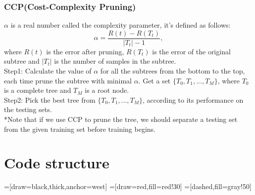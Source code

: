 \documentclass[50pt]{article}
\begin{document}
\subsubsection{CCP(Cost-Complexity Pruning)}
$\alpha$ is a real number called the complexity parameter, it's defined as follows: 
$$\alpha = \frac{R(t)- R(T_{t})}{|T_{t}|-1},$$ where $R(t)$ is the error after pruning, $R(T_{t})$ is the error of the original subtree and $|T_{t}|$ is the number of samples in the subtree.\\
Step1: Calculate the value of $\alpha$ for all the subtrees from the bottom to the top, each time prune the subtree with minimal $\alpha$. Get a set $\{T_{0}, T_{1},..., T_{M}\}$, where $T_{0}$ is a complete tree and $T_{M}$ is a root node.\\
Step2: Pick the best tree from $\{T_{0}, T_{1},..., T_{M}\}$, according to its performance on the testing sets.\\
*Note that if we use CCP to prune the tree, we should separate a testing set from the given training set before training begins.
\section{Code structure}
=[draw=black,thick,anchor=west]
	=[draw=red,fill=red!30]
	=[dashed,fill=gray!50]
\end{document}
